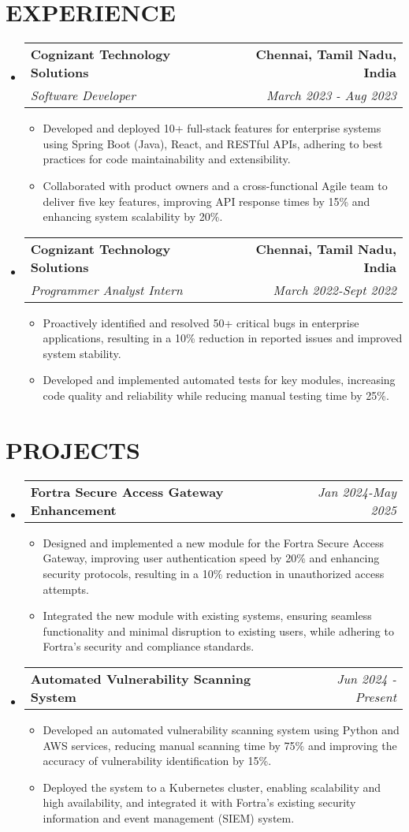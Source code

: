 \documentclass[letterpaper,11pt]{article}
\makeatletter
\newcommand{\resumeItem}[1]{\item\small{{#1 \vspace{-2pt}}}}
\newcommand{\resumeSubheading}[4]{\vspace{-2pt}\item\begin{tabular*}{0.97\textwidth}[t]{l@{\extracolsep{\fill}}r}\textbf{#1} & #2 \\\textit{\small#3} & \textit{\small #4} \\\end{tabular*}\vspace{-7pt}}
\newcommand{\resumeProjectHeading}[2]{\item\begin{tabular*}{0.97\textwidth}{l@{\extracolsep{\fill}}r}\small#1 & #2 \\\end{tabular*}\vspace{-7pt}}
\newcommand{\resumeSubHeadingListStart}{\begin{itemize}[leftmargin=0.15in, label={}]}
\newcommand{\resumeSubHeadingListEnd}{\end{itemize}}
\newcommand{\resumeItemListStart}{\begin{itemize}}
\newcommand{\resumeItemListEnd}{\end{itemize}\vspace{-5pt}}
\makeatother
\begin{document}
\section{{\fontsize{9pt}{20pt}\selectfont \textbf{EXPERIENCE}}}
\resumeSubHeadingListStart
\resumeSubheading{Cognizant Technology Solutions}{\textbf{Chennai, Tamil Nadu, India}}{Software Developer}{March 2023 - Aug 2023}
\resumeItemListStart
\resumeItem{Developed and deployed 10+ full-stack features for enterprise systems using Spring Boot (Java), React, and RESTful APIs, adhering to best practices for code maintainability and extensibility.}
\resumeItem{Collaborated with product owners and a cross-functional Agile team to deliver five key features, improving API response times by 15\% and enhancing system scalability by 20\%.}
\resumeItemListEnd
\resumeSubheading{Cognizant Technology Solutions}{\textbf{Chennai, Tamil Nadu, India}}{Programmer Analyst Intern}{March 2022-Sept 2022}
\resumeItemListStart
\resumeItem{Proactively identified and resolved 50+ critical bugs in enterprise applications, resulting in a 10\% reduction in reported issues and improved system stability.}
\resumeItem{Developed and implemented automated tests for key modules, increasing code quality and reliability while reducing manual testing time by 25\%.}
\resumeItemListEnd
\resumeSubHeadingListEnd
\vspace{-17pt}

\section{{\fontsize{9pt}{20pt}\selectfont \textbf{PROJECTS}}}
\resumeSubHeadingListStart
\resumeProjectHeading{\textbf{Fortra Secure Access Gateway Enhancement}}{\textit{Jan 2024-May 2025}}
\resumeItemListStart
\resumeItem{Designed and implemented a new module for the Fortra Secure Access Gateway, improving user authentication speed by 20\% and enhancing security protocols, resulting in a 10\% reduction in unauthorized access attempts.}
\resumeItem{Integrated the new module with existing systems, ensuring seamless functionality and minimal disruption to existing users, while adhering to Fortra's security and compliance standards.}
\resumeItemListEnd\vspace{-6pt}
\resumeProjectHeading{\textbf{Automated Vulnerability Scanning System}}{\textit{Jun 2024 - Present}}
\resumeItemListStart
\resumeItem{Developed an automated vulnerability scanning system using Python and AWS services, reducing manual scanning time by 75\% and improving the accuracy of vulnerability identification by 15\%.}
\resumeItem{Deployed the system to a Kubernetes cluster, enabling scalability and high availability, and integrated it with Fortra's existing security information and event management (SIEM) system.}
\resumeItemListEnd
\resumeSubHeadingListEnd
\vspace{-17pt}
\end{document}
